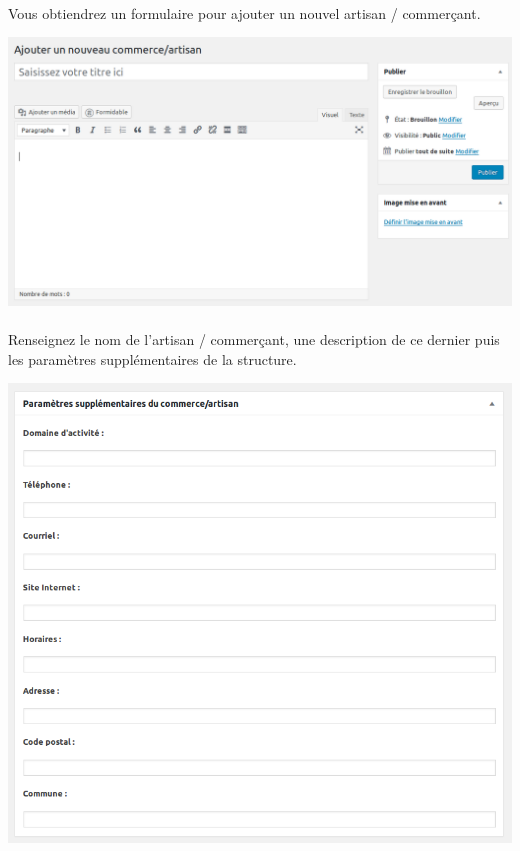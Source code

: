\documentclass[10pt,a4paper]{article}
\begin{document}
\paragraph{}Vous obtiendrez un formulaire pour ajouter un nouvel artisan / commerçant.
\begin{center}
\includegraphics[scale=0.2]{img/0309.png}
\end{center}
\paragraph{}Renseignez le nom de l'artisan / commerçant, une description de ce dernier puis les paramètres supplémentaires de la structure.
\begin{center}
\includegraphics[scale=0.3]{img/0310.png}
\end{center}
\end{document}
